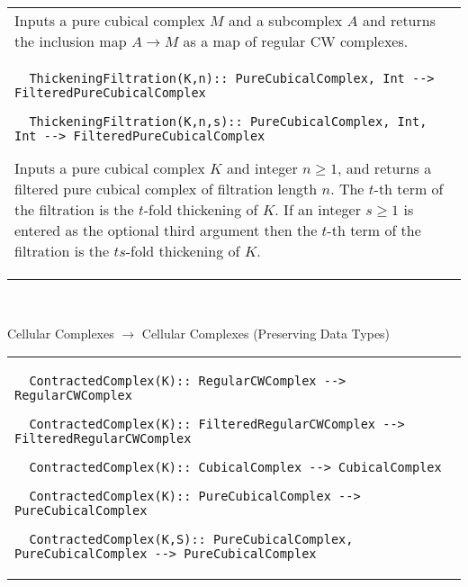 \documentclass[a4paper,11pt]{report}
\begin{document}
{\begin{center}
\begin{tabular}{|l|}
 

 Inputs a pure cubical complex $M$ and a subcomplex $A$ and returns the inclusion map $A \rightarrow M$ as a map of regular CW complexes. \\
 \index{ThickeningFiltration} 
\begin{verbatim}  ThickeningFiltration(K,n):: PureCubicalComplex, Int --> FilteredPureCubicalComplex
\end{verbatim}
 
\begin{verbatim}  ThickeningFiltration(K,n,s):: PureCubicalComplex, Int, Int --> FilteredPureCubicalComplex
\end{verbatim}


 

 Inputs a pure cubical complex $K$ and integer $n \ge 1$, and returns a filtered pure cubical complex of filtration length $n$. The $t$-th term of the filtration is the $t$-fold thickening of $K$. If an integer $s \ge 1$ is entered as the optional third argument then the $t$-th term of the filtration is the $ts$-fold thickening of $K$. \\
\end{tabular}\\[2mm]
\end{center}

 Cellular Complexes $\longrightarrow$ Cellular Complexes (Preserving Data Types) \begin{center}
\begin{tabular}{|l|} \index{ContractedComplex} 
\begin{verbatim}  ContractedComplex(K):: RegularCWComplex --> RegularCWComplex
\end{verbatim}
 
\begin{verbatim}  ContractedComplex(K):: FilteredRegularCWComplex --> FilteredRegularCWComplex
\end{verbatim}
 
\begin{verbatim}  ContractedComplex(K):: CubicalComplex --> CubicalComplex
\end{verbatim}
 
\begin{verbatim}  ContractedComplex(K):: PureCubicalComplex --> PureCubicalComplex
\end{verbatim}
 
\begin{verbatim}  ContractedComplex(K,S):: PureCubicalComplex, PureCubicalComplex --> PureCubicalComplex
\end{verbatim}
 

\end{tabular}
\end{center}}
\end{document}
